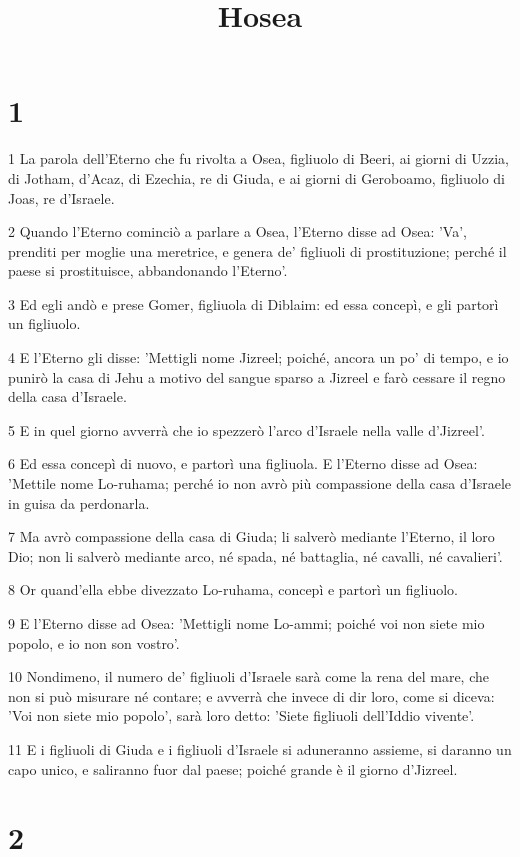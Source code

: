 

\title{Hosea}


\chapter{1}

\par 1 La parola dell'Eterno che fu rivolta a Osea, figliuolo di Beeri, ai giorni di Uzzia, di Jotham, d'Acaz, di Ezechia, re di Giuda, e ai giorni di Geroboamo, figliuolo di Joas, re d'Israele.
\par 2 Quando l'Eterno cominciò a parlare a Osea, l'Eterno disse ad Osea: 'Va', prenditi per moglie una meretrice, e genera de' figliuoli di prostituzione; perché il paese si prostituisce, abbandonando l'Eterno'.
\par 3 Ed egli andò e prese Gomer, figliuola di Diblaim: ed essa concepì, e gli partorì un figliuolo.
\par 4 E l'Eterno gli disse: 'Mettigli nome Jizreel; poiché, ancora un po' di tempo, e io punirò la casa di Jehu a motivo del sangue sparso a Jizreel e farò cessare il regno della casa d'Israele.
\par 5 E in quel giorno avverrà che io spezzerò l'arco d'Israele nella valle d'Jizreel'.
\par 6 Ed essa concepì di nuovo, e partorì una figliuola. E l'Eterno disse ad Osea: 'Mettile nome Lo-ruhama; perché io non avrò più compassione della casa d'Israele in guisa da perdonarla.
\par 7 Ma avrò compassione della casa di Giuda; li salverò mediante l'Eterno, il loro Dio; non li salverò mediante arco, né spada, né battaglia, né cavalli, né cavalieri'.
\par 8 Or quand'ella ebbe divezzato Lo-ruhama, concepì e partorì un figliuolo.
\par 9 E l'Eterno disse ad Osea: 'Mettigli nome Lo-ammi; poiché voi non siete mio popolo, e io non son vostro'.
\par 10 Nondimeno, il numero de' figliuoli d'Israele sarà come la rena del mare, che non si può misurare né contare; e avverrà che invece di dir loro, come si diceva: 'Voi non siete mio popolo', sarà loro detto: 'Siete figliuoli dell'Iddio vivente'.
\par 11 E i figliuoli di Giuda e i figliuoli d'Israele si aduneranno assieme, si daranno un capo unico, e saliranno fuor dal paese; poiché grande è il giorno d'Jizreel.

\chapter{2}

